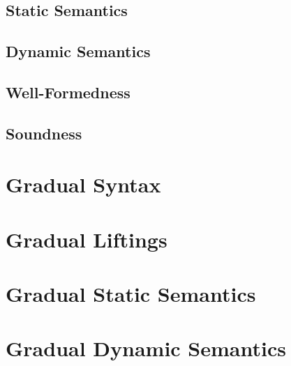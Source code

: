     \subsection{Static Semantics}
    \label{sec:static-semantics}
    
    
    \subsection{Dynamic Semantics}
    \label{ssec:dynamic-semantics}
    
    
    \subsection{Well-Formedness}
    \label{sec:well-formedness}
    
    
    \subsection{Soundness}
    \label{ssec:soundness}
    

\section{Gradual Syntax}
\label{sec:cs-gradual-formulas}


\section{Gradual Liftings}
\label{sec:gradual-liftings}


\section{Gradual Static Semantics}
\label{sec:gradualize-hoare-rules}

    
%    

\section{Gradual Dynamic Semantics}
\label{sec:gradual-dyn--semantics}


